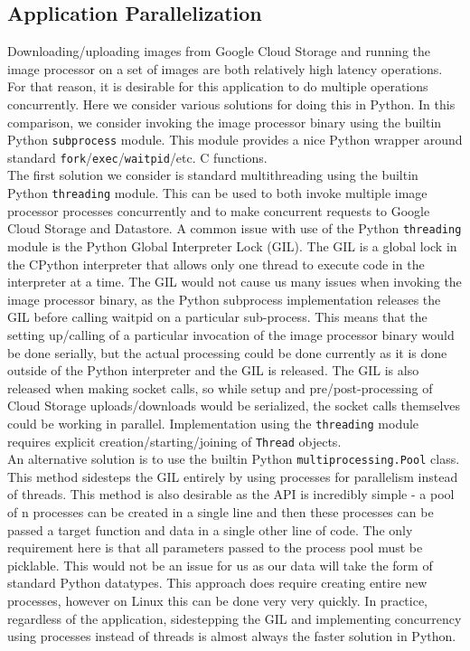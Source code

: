 \documentclass[10pt, onecolumn, draftclsnofoot, letterpaper, compsoc]{IEEEtran}
\begin{document}
\subsection{Application Parallelization}

Downloading/uploading images from Google Cloud Storage and running the
image processor on a set of images are both relatively high latency operations.
For that reason, it is desirable for this application to do multiple operations
concurrently. Here we consider various solutions for doing this in Python. In
this comparison, we consider invoking the image processor binary using the
builtin Python {\tt subprocess} module. This module provides a nice Python wrapper
around standard {\tt fork}/{\tt exec}/{\tt waitpid}/etc. C functions. \\

The first solution we consider is standard multithreading using the builtin
Python {\tt threading} module. This can be used to both invoke multiple image
processor processes concurrently and to make concurrent requests to Google
Cloud Storage and Datastore. A common issue with use of the Python {\tt threading}
module is the Python Global Interpreter Lock (GIL)\cite{gilArticle}. The GIL
is a global lock in the CPython interpreter that allows only one thread to
execute code in the interpreter at a time\cite{gilArticle}. The GIL would
not cause us many issues when invoking the image processor binary, as
the Python subprocess implementation releases the GIL before calling
waitpid on a particular sub-process. This means that the
setting up/calling of a particular invocation of the image processor binary
would be done serially, but the actual processing could be done currently as
it is done outside of the Python interpreter and the GIL is released\cite{gilArticle}.
The GIL is also released when making socket calls, so while setup and
pre/post-processing of Cloud Storage uploads/downloads would be
serialized, the socket calls themselves could be working in parallel\cite{gilArticle}.
Implementation using the {\tt threading} module requires explicit
creation/starting/joining of {\tt Thread} objects. \\

An alternative solution is to use the builtin Python {\tt multiprocessing.Pool}
class. This method sidesteps the GIL entirely by using processes for
parallelism instead of threads\cite{multiproc}. This method is also desirable
as the API is incredibly simple - a pool of n processes can be created in a
single line and then these processes can be passed a target function and
data in a single other line of code\cite{multiproc}. The only requirement
here is that all parameters passed to the process pool must be picklable\cite{multiproc}.
This would not be an issue for us as our data will take the form of standard
Python datatypes. This approach does require creating entire new processes,
however on Linux this can be done very very quickly. In practice, regardless
of the application, sidestepping the GIL and implementing concurrency using
processes instead of threads is almost always the faster solution in Python. \\
\end{document}
